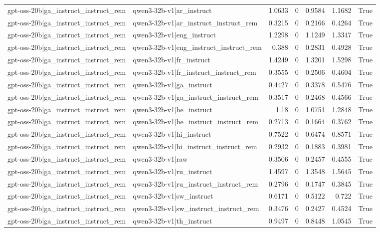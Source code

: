 \begin{table}
\begin{tabular}{l l r r r r l}
gpt-oss-20b|ga_instruct_instruct_rem & qwen3-32b-v1|ar_instruct & 1.0633 & 0 & 0.9584 & 1.1682 & True \\
gpt-oss-20b|ga_instruct_instruct_rem & qwen3-32b-v1|ar_instruct_instruct_rem & 0.3215 & 0 & 0.2166 & 0.4264 & True \\
gpt-oss-20b|ga_instruct_instruct_rem & qwen3-32b-v1|eng_instruct & 1.2298 & 0 & 1.1249 & 1.3347 & True \\
gpt-oss-20b|ga_instruct_instruct_rem & qwen3-32b-v1|eng_instruct_instruct_rem & 0.388 & 0 & 0.2831 & 0.4928 & True \\
gpt-oss-20b|ga_instruct_instruct_rem & qwen3-32b-v1|fr_instruct & 1.4249 & 0 & 1.3201 & 1.5298 & True \\
gpt-oss-20b|ga_instruct_instruct_rem & qwen3-32b-v1|fr_instruct_instruct_rem & 0.3555 & 0 & 0.2506 & 0.4604 & True \\
gpt-oss-20b|ga_instruct_instruct_rem & qwen3-32b-v1|ga_instruct & 0.4427 & 0 & 0.3378 & 0.5476 & True \\
gpt-oss-20b|ga_instruct_instruct_rem & qwen3-32b-v1|ga_instruct_instruct_rem & 0.3517 & 0 & 0.2468 & 0.4566 & True \\
gpt-oss-20b|ga_instruct_instruct_rem & qwen3-32b-v1|he_instruct & 1.18 & 0 & 1.0751 & 1.2848 & True \\
gpt-oss-20b|ga_instruct_instruct_rem & qwen3-32b-v1|he_instruct_instruct_rem & 0.2713 & 0 & 0.1664 & 0.3762 & True \\
gpt-oss-20b|ga_instruct_instruct_rem & qwen3-32b-v1|hi_instruct & 0.7522 & 0 & 0.6474 & 0.8571 & True \\
gpt-oss-20b|ga_instruct_instruct_rem & qwen3-32b-v1|hi_instruct_instruct_rem & 0.2932 & 0 & 0.1883 & 0.3981 & True \\
gpt-oss-20b|ga_instruct_instruct_rem & qwen3-32b-v1|raw & 0.3506 & 0 & 0.2457 & 0.4555 & True \\
gpt-oss-20b|ga_instruct_instruct_rem & qwen3-32b-v1|ru_instruct & 1.4597 & 0 & 1.3548 & 1.5645 & True \\
gpt-oss-20b|ga_instruct_instruct_rem & qwen3-32b-v1|ru_instruct_instruct_rem & 0.2796 & 0 & 0.1747 & 0.3845 & True \\
gpt-oss-20b|ga_instruct_instruct_rem & qwen3-32b-v1|sw_instruct & 0.6171 & 0 & 0.5122 & 0.722 & True \\
gpt-oss-20b|ga_instruct_instruct_rem & qwen3-32b-v1|sw_instruct_instruct_rem & 0.3476 & 0 & 0.2427 & 0.4524 & True \\
gpt-oss-20b|ga_instruct_instruct_rem & qwen3-32b-v1|th_instruct & 0.9497 & 0 & 0.8448 & 1.0545 & True \\

\end{tabular}
\end{table}

